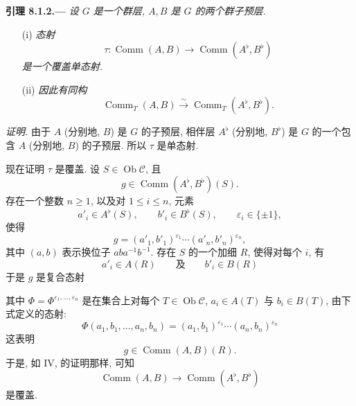 
\medskip
{}\label{lem:sga3-VIB-8.1.2}%
\noindent\textbf{引理 8.1.2.---}
\emph{设 \(G\) 是一个群层, \(A,B\) 是 \(G\) 的两个群子预层.}
\begin{enumerate}
\item[\textup{\SGAInlineRefTarget{lem:sga3-VIB-8.1.2:item:i}(i)}]\label{concl:sga3-VIB-8.1.2-i}
  \emph{态射}
  \[
    \tau:\operatorname{Comm}(A,B)
      \longrightarrow
      \operatorname{Comm}(A^\flat,B^\flat)
  \]
  \emph{是一个覆盖单态射.}

\item[\textup{(ii)}]\label{concl:sga3-VIB-8.1.2-ii}
  \emph{因此有同构}
  \label{form:sga3-VIB-8.1.2-CommT-isomorphism}%
  \[
    \operatorname{Comm}_T(A,B)
      \xrightarrow{\ \sim\ }
    \operatorname{Comm}_T(A^\flat,B^\flat).
  \]
\end{enumerate}

\emph{证明.}
\textup{}
由于 \(A\) (分别地, \(B\)) 是 \(G\) 的子预层,
相伴层 \(A^\flat\) (分别地, \(B^\flat\))
是 \(G\) 的一个包含 \(A\) (分别地, \(B\)) 的子预层.
所以 \(\tau\) 是单态射.

现在证明 \(\tau\) 是覆盖.
设 \(S\in\operatorname{Ob}\mathcal C\), 且
\[
  g\in\operatorname{Comm}(A^\flat,B^\flat)(S).
\]
存在一个整数 \(n\geq1\), 以及对 \(1\leq i\leq n\), 元素
\[
  a'_i\in A^\flat(S),\qquad
  b'_i\in B^\flat(S),\qquad
  \varepsilon_i\in\{\pm1\},
\]
使得
\[
  g=(a'_1,b'_1)^{\varepsilon_1}\cdots
    (a'_n,b'_n)^{\varepsilon_n},
\]
其中 \((a,b)\) 表示换位子 \(aba^{-1}b^{-1}\).
存在 \(S\) 的一个加细 \(R\), 使得对每个 \(i\), 有
\[
  a'_i\in A(R)
  \qquad\text{及}\qquad
  b'_i\in B(R)
\]
于是 \(g\) 是复合态射
\begin{center}
  \label{diag:sga3-VIB-8.1.2-composite}%
\end{center}
其中 \(\Phi=\Phi^{\varepsilon_1,\ldots,\varepsilon_n}\)
是在集合上对每个 \(T\in\operatorname{Ob}\mathcal C\),
\(a_i\in A(T)\) 与 \(b_i\in B(T)\), 由下式定义的态射:
\label{form:sga3-VIB-8.1.2-Phi}%
\[
  \Phi(a_1,b_1,\ldots,a_n,b_n)
    =(a_1,b_1)^{\varepsilon_1}\cdots
     (a_n,b_n)^{\varepsilon_n}
\]
这表明
\[
  g\in\operatorname{Comm}(A,B)(R).
\]
于是, 如 IV,
\textup{}
的证明那样, 可知
\[
  \operatorname{Comm}(A,B)
    \longrightarrow
  \operatorname{Comm}(A^\flat,B^\flat)
\]
是覆盖.

